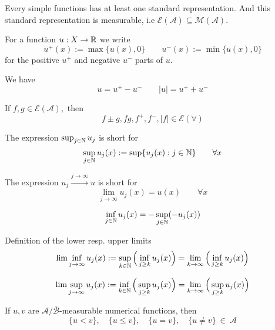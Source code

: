 \begin{prop}
Every simple functions has at least one standard representation. And this standard representation is measurable, i.e \(\mathcal{E}(\mathcal{A})\subseteq \mathcal{M}(\mathcal{A}).\)
\end{prop}
\begin{defn}
For a function \(u:X\rightarrow \Bbb{R}\) we write
\[
u^+(x):=\max\{u(x),0\} \qquad u^-(x):=\min\{u(x),0\}
\]
for the positive \(u^+\) and negative \(u^-\) parts of \(u\).
\end{defn}

\begin{prop}
We have
\[
u=u^+-u^- \qquad |u|=u^++u^-
\]
\end{prop}

\begin{prop}
If \(f,g\in \mathcal{E}(\mathcal{A}),\) then
\[
f\pm g,fg,f^+,f^-,|f|\in \mathcal{E}(\forall )
\]
\end{prop}

\begin{defn}
The expression \(\sup_{j\in \Bbb{N}}u_{j}\) is short for
\[
\sup_{j\in \Bbb{N}}u_{j}(x):=\sup\{u_{j}(x):j\in \Bbb{N}\} \qquad \forall x
\]
\end{defn}

\begin{defn}
The expression \(u_{j}\overset{j\rightarrow \infty }{\longrightarrow }u\) is short for
\[
\lim_{j\rightarrow \infty }u_{j}(x)=u(x) \qquad \forall x
\]
\end{defn}

\begin{prop}
\[
\inf_{j\in \Bbb{N}} u_{j}(x)=-\sup_{j\in \Bbb{N}}(-u_{j}(x))
\]
\end{prop}

\begin{defn}
Definition of the lower resp. upper limits
\[
\lim\inf_{j\rightarrow \infty } u_{j}(x):=\sup_{k\in \Bbb{N}}\Big(\inf_{j\geq k}u_{j}(x)\Big)=\lim_{k\rightarrow \infty }\Big(\inf_{j\geq k}u_{j}(x)\Big)
\]

\[
\lim\sup_{j\rightarrow \infty } u_{j}(x):=\inf_{k\in \Bbb{N}}\Big(\sup_{j\geq k}u_{j}(x)\Big)=\lim_{k\rightarrow \infty }\Big(\sup_{j\geq k}u_{j}(x)\Big)
\]
\end{defn}

\begin{prop}
If \(u,v\) are \(\mathcal{A}/\bar{\mathcal{B}}\)-measurable numerical functions, then
\[
\{u<v\},\quad \{u\leq v\}, \quad \{u=v\}, \quad  \{u\neq v\}\  \in \  \mathcal{A}
\]
\end{prop}

